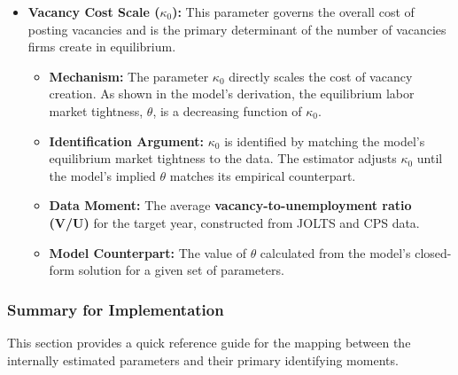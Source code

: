 \documentclass[
  11pt,
  letterpaper,
  DIV=11,
  numbers=noendperiod]{scrartcl}
\providecommand{\tightlist}{%
  \setlength{\itemsep}{0pt}\setlength{\parskip}{0pt}}\usepackage{longtable,booktabs,array}
\begin{document}
\begin{itemize}
\tightlist
\item
  \textbf{Vacancy Cost Scale (\(\kappa_0\)):} This parameter governs the
  overall cost of posting vacancies and is the primary determinant of
  the number of vacancies firms create in equilibrium.

  \begin{itemize}
  \tightlist
  \item
    \textbf{Mechanism:} The parameter \(\kappa_0\) directly scales the
    cost of vacancy creation. As shown in the model's derivation, the
    equilibrium labor market tightness, \(\theta\), is a decreasing
    function of \(\kappa_0\).
  \item
    \textbf{Identification Argument:} \(\kappa_0\) is identified by
    matching the model's equilibrium market tightness to the data. The
    estimator adjusts \(\kappa_0\) until the model's implied \(\theta\)
    matches its empirical counterpart.
  \item
    \textbf{Data Moment:} The average \textbf{vacancy-to-unemployment
    ratio (V/U)} for the target year, constructed from JOLTS and CPS
    data.
  \item
    \textbf{Model Counterpart:} The value of \(\theta\) calculated from
    the model's closed-form solution for a given set of parameters.
  \end{itemize}
\end{itemize}

\subsubsection{\texorpdfstring{\textbf{Summary for
Implementation}}{Summary for Implementation}}\label{summary-for-implementation}

This section provides a quick reference guide for the mapping between
the internally estimated parameters and their primary identifying
moments.
\end{document}
